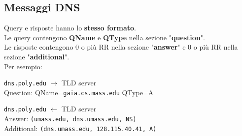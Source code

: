 \documentclass[10pt]{article}
\begin{document}
\subsection{Messaggi DNS}
Query e risposte hanno lo \textbf{stesso formato}.\\
Le query contengono \textbf{QName} e \textbf{QType} nella sezione "\textbf{question}".\\
Le risposte contengono 0 o più RR nella sezione "\textbf{answer}" e 0 o più RR nella sezione "\textbf{additional}".\\
Per esempio:
\begin{list}{}{}
\item \texttt{dns.poly.edu} $\longrightarrow$ TLD server\\
Question: QName=\texttt{gaia.cs.mass.edu} QType=A
\item \texttt{dns.poly.edu} $\longleftarrow$ TLD server\\
Answer: \texttt{(umass.edu, dns.umass.edu, NS)}\\
Additional: \texttt{(dns.umass.edu, 128.115.40.41, A)}
\end{list}
\pagebreak
\end{document}
